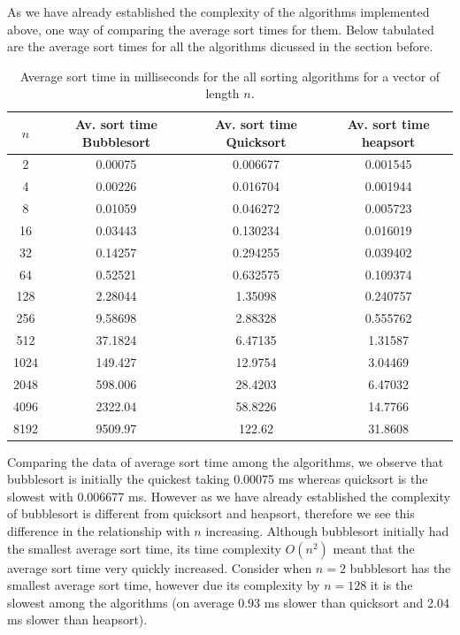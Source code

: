 \documentclass[a4paper, 12pt]{article}
\begin{document}
As we have already established the complexity of the algorithms implemented above, one way of comparing the average sort times for them. Below tabulated are the average sort times for all the algorithms dicussed in the section before. 
\begin{table} [H]
\centering
\begin{tabular}{ c | c | c | c }
$n$ & Av. sort time Bubblesort  & Av. sort time Quicksort & Av. sort time heapsort \\ \hline
         2      &       0.00075  &0.006677 &0.001545\\
         4       &      0.00226 & 0.016704 &0.001944\\
         8        &     0.01059 &  0.046272 &0.005723\\
        16        &     0.03443 & 0.130234 & 0.016019\\
        32        &     0.14257 & 0.294255 &0.039402\\
        64         &    0.52521 &  0.632575 &0.109374\\
       128        &     2.28044 & 1.35098 &0.240757\\
       256        &     9.58698 &  2.88328 &0.555762\\
       512        &     37.1824 & 6.47135 &1.31587\\
      1024       &      149.427 &12.9754 &3.04469\\
      2048       &      598.006 & 28.4203 &6.47032\\
      4096       &      2322.04 & 58.8226 &14.7766\\
      8192       &      9509.97 & 122.62 &31.8608\\
\end{tabular}
\caption{Average sort time in milliseconds for the all sorting algorithms for a vector of length $n$.}
\end{table} 
Comparing the data of average sort time among the algorithms, we observe that bubblesort is initially the quickest taking 0.00075 ms whereas quicksort is the slowest with 0.006677 ms. However as we have already established the complexity of bubblesort is different from quicksort and heapsort, therefore we see this difference in the relationship with $n$ increasing. Although bubblesort initially had the smallest average sort time, its time complexity $O(n^2)$ meant that the average sort time very quickly increased. Consider when $n=2$ bubblesort has the smallest average sort time, however due its complexity by $n=128$ it is the slowest among the algorithms (on average 0.93 ms slower than quicksort and 2.04 ms slower than heapsort). \\
\end{document}
